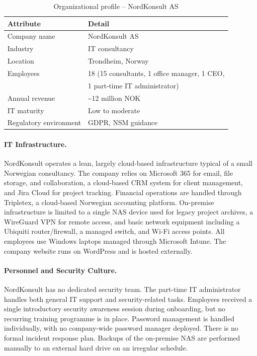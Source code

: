 \begin{table}[ht]
\centering
\caption{Organizational profile -- NordKonsult AS}
\label{tab:nordkonsult-profile}
\begin{tabular}{ll}
\hline
\textbf{Attribute}         & \textbf{Detail} \\
\hline
Company name               & NordKonsult AS \\
Industry                   & IT consultancy \\
Location                   & Trondheim, Norway \\
Employees                  & 18 (15 consultants, 1 office manager, 1 CEO, \\
                           & 1 part-time IT administrator) \\
Annual revenue             & \textasciitilde 12 million NOK \\
IT maturity                & Low to moderate \\
Regulatory environment     & GDPR, NSM guidance \\
\hline
\end{tabular}
\end{table}
 
\paragraph{IT Infrastructure.}
NordKonsult operates a lean, largely cloud-based infrastructure typical of a small Norwegian consultancy. The company relies on Microsoft 365 for email, file storage, and collaboration, a cloud-based CRM system for client management, and Jira Cloud for project tracking. Financial operations are handled through Tripletex, a cloud-based Norwegian accounting platform. On-premise infrastructure is limited to a single NAS device used for legacy project archives, a WireGuard VPN for remote access, and basic network equipment including a Ubiquiti router/firewall, a managed switch, and Wi-Fi access points. All employees use Windows laptops managed through Microsoft Intune. The company website runs on WordPress and is hosted externally.
 
\paragraph{Personnel and Security Culture.}
NordKonsult has no dedicated security team. The part-time IT administrator handles both general IT support and security-related tasks. Employees received a single introductory security awareness session during onboarding, but no recurring training programme is in place. Password management is handled individually, with no company-wide password manager deployed. There is no formal incident response plan. Backups of the on-premise NAS are performed manually to an external hard drive on an irregular schedule.
 
